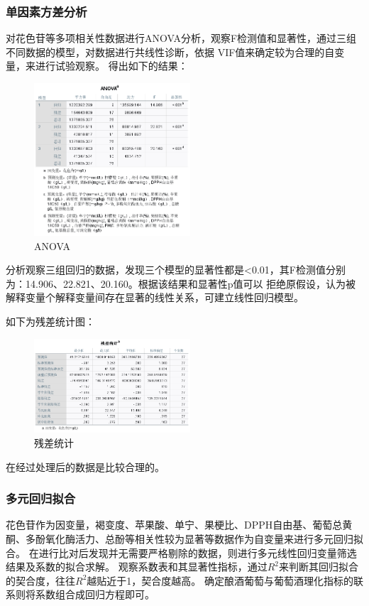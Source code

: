 \documentclass[UTF8]{ctexart}
\begin{document}
\subsubsection{单因素方差分析}
对花色苷等多项相关性数据进行ANOVA分析，观察F检测值和显著性，通过三组不同数据的模型，对数据进行共线性诊断，依据
VIF值来确定较为合理的自变量，来进行试验观察。
得出如下的结果：
\begin{figure}[H]\centering

	\includegraphics[width=0.52\textwidth,height=0.45\textwidth]{img/ANOVA.png} %

	\caption{ANOVA} %
	\label{fig:figure 5} %
\end{figure}

分析观察三组回归的数据，发现三个模型的显著性都是<0.01，其F检测值分别为：14.906、22.821、20.160。根据该结果和显著性p值可以
拒绝原假设，认为被解释变量个解释变量间存在显著的线性关系，可建立线性回归模型。

如下为残差统计图：
\begin{figure}[H]\centering
	\includegraphics[width=0.52\textwidth,height=0.45\textwidth]{img/Residuals_Statistics.png} %
	\caption{残差统计} %
	\label{fig:figure 6} %
\end{figure}
在经过处理后的数据是比较合理的。

\subsubsection{多元回归拟合}
花色苷作为因变量，褐变度、苹果酸、单宁、果梗比、DPPH自由基、葡萄总黄酮、多酚氧化酶活力、总酚等相关性较为显著等数据作为自变量来进行多元回归拟合。
在进行比对后发现并无需要严格剔除的数据，则进行多元线性回归变量筛选结果及系数的拟合求解。
观察系数表和其显著性指标，通过${R^2}$来判断其回归拟合的契合度，往往${R^2}$越贴近于1，契合度越高。
确定酿酒葡萄与葡萄酒理化指标的联系则将系数组合成回归方程即可。
\end{document}
